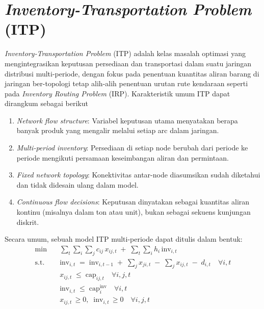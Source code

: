 \documentclass{file/TA-ITS}
\theoremstyle{definition}
\theoremstyle{definition}
\theoremstyle{plain}
\begin{document}
\section{\textit{Inventory-Transportation Problem }(ITP)}
\textit{Inventory‑Transportation Problem} (ITP) adalah kelas masalah optimasi yang mengintegrasikan keputusan persediaan dan transportasi dalam suatu jaringan distribusi multi-periode, dengan fokus pada penentuan kuantitas aliran barang di jaringan ber-topologi tetap alih-alih penentuan urutan rute kendaraan seperti pada \textit{Inventory Routing Problem} (IRP). Karakteristik umum ITP dapat dirangkum sebagai berikut
\begin{enumerate}
    \item \textit{Network flow structure}: Variabel keputusan utama menyatakan berapa banyak produk yang mengalir melalui setiap arc dalam jaringan.
    \item \textit{Multi-period inventory}: Persediaan di setiap node berubah dari periode ke periode mengikuti persamaan keseimbangan aliran dan permintaan.
    \item \textit{Fixed network topology}: Konektivitas antar-node diasumsikan sudah diketahui dan tidak didesain ulang dalam model.
    \item \textit{Continuous flow decisions}: Keputusan dinyatakan sebagai kuantitas aliran kontinu (misalnya dalam ton atau unit), bukan sebagai sekuens kunjungan diskrit.
\end{enumerate}

Secara umum, sebuah model ITP multi-periode dapat ditulis dalam bentuk:
\begin{align}
\label{eq:itp_general}
\min \quad & \sum_{t} \sum_{i} \sum_{j} c_{ij} \, x_{ij,t} \;+\; \sum_{t} \sum_{i} h_i \, \text{inv}_{i,t} \\
\text{s.t.} \quad 
& \text{inv}_{i,t} \;=\; \text{inv}_{i,t-1} \;+\; \sum_{j} x_{ji,t} \;-\; \sum_{j} x_{ij,t} \;-\; d_{i,t} \quad \forall i,t \\
& x_{ij,t} \;\leq\; \text{cap}_{ij,t} \quad \forall i,j,t \\
& \text{inv}_{i,t} \;\leq\; \text{cap}^{\text{inv}}_{i} \quad \forall i,t \\
& x_{ij,t} \,\geq 0,\;\; \text{inv}_{i,t} \,\geq 0 \quad \forall i,j,t
\end{align}
\end{document}
